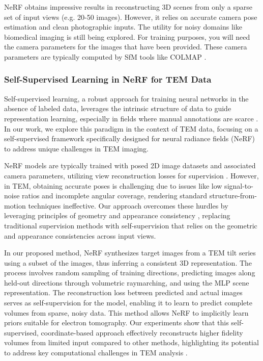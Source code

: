     
NeRF obtains impressive results in reconstructing 3D scenes from only a sparse set of input views (e.g. 20-50 images). However, it relies on accurate camera pose estimation and clean photographic inputs. The utility for noisy domains like biomedical imaging is still being explored. For training purposes, you will need the camera parameters for the images that have been provided. These camera parameters are typically computed by SfM tools like COLMAP \cite{Mildenhall2020}.


\vspace{10pt}


\subsubsection{Self-Supervised Learning in NeRF for TEM Data}

Self-supervised learning, a robust approach for training neural networks in the absence of labeled data, leverages the intrinsic structure of data to guide representation learning, especially in fields where manual annotations are scarce \cite{Kolesnikov2019}. In our work, we explore this paradigm in the context of TEM data, focusing on a self-supervised framework specifically designed for neural radiance fields (NeRF) to address unique challenges in TEM imaging.

\vspace{10pt}

NeRF models are typically trained with posed 2D image datasets and associated camera parameters, utilizing view reconstruction losses for supervision \cite{Mildenhall2020}. However, in TEM, obtaining accurate poses is challenging due to issues like low signal-to-noise ratios and incomplete angular coverage, rendering standard structure-from-motion techniques ineffective. Our approach overcomes these hurdles by leveraging principles of geometry \cite{Chiyu2020} and appearance consistency \cite{Chiyu2020}, replacing traditional supervision methods with self-supervision that relies on the geometric and appearance consistencies across input views.

\vspace{10pt}
In our proposed method, NeRF synthesizes target images from a TEM tilt series using a subset of the images, thus inferring a consistent 3D representation. The process involves random sampling of training directions, predicting images along held-out directions through volumetric raymarching, and using the MLP scene representation. The reconstruction loss between predicted and actual images serves as self-supervision for the model, enabling it to learn to predict complete volumes from sparse, noisy data. This method allows NeRF to implicitly learn priors suitable for electron tomography. Our experiments show that this self-supervised, coordinate-based approach effectively reconstructs higher fidelity volumes from limited input compared to other methods, highlighting its potential to address key computational challenges in TEM analysis \cite{Sitzmann2020}.


